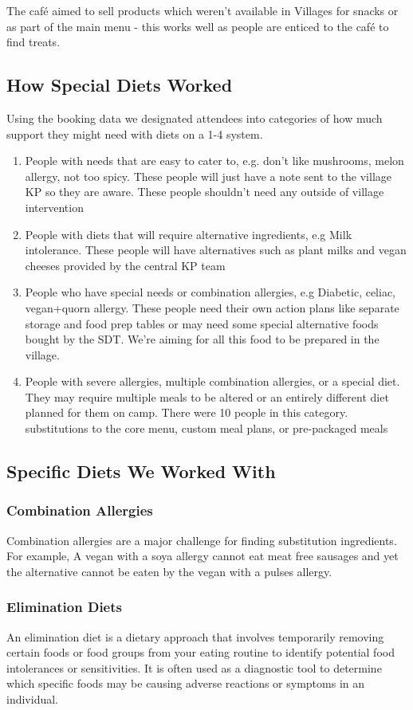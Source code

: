 The café aimed to sell products which weren't available in Villages for snacks or as part of the main menu - this works well as people are enticed to the café to find treats. 
\subsection{How Special Diets Worked}
Using the booking data we designated attendees into categories of how much support they might need with diets on a 1-4 system.
\begin{enumerate}
    \item People with needs that are easy to cater to, e.g. don't like mushrooms, melon allergy, not too spicy. These people will just have a note sent to the village KP so they are aware. These people shouldn't need any outside of village intervention
    \item People with diets that will require alternative ingredients, e.g Milk intolerance. These people will have alternatives such as plant milks and vegan cheeses provided by the central KP team
    \item People who have special needs or combination allergies, e.g Diabetic, celiac, vegan+quorn allergy. These people need their own action plans like separate storage and food prep tables or may need some special alternative foods bought by the SDT. We're aiming for all this food to be prepared in the village. 
    \item People with severe allergies, multiple combination allergies, or a special diet. They may require multiple meals to be altered or an entirely different diet planned for them on camp. There were 10 people in this category. substitutions to the core menu, custom meal plans, or pre-packaged meals
\end{enumerate}
\subsection{Specific Diets We Worked With}
\subsubsection{Combination Allergies}
Combination allergies are a major challenge for finding substitution ingredients. For example, A vegan with a soya allergy cannot eat meat free sausages and yet the alternative cannot be eaten by the vegan with a pulses allergy. 
\subsubsection{Elimination Diets}
An elimination diet is a dietary approach that involves temporarily removing certain foods or food groups from your eating routine to identify potential food intolerances or sensitivities. It is often used as a diagnostic tool to determine which specific foods may be causing adverse reactions or symptoms in an individual. 
